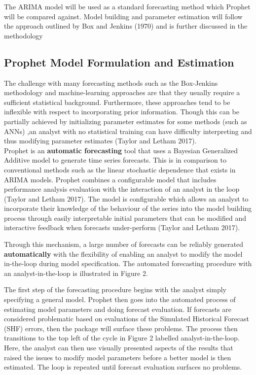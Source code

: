 \documentclass[12pt,a4paper]{article}
\numberwithin{equation}{section}
\numberwithin{figure}{section}
\numberwithin{table}{section}
\begin{document}
The ARIMA model will be used as a standard forecasting method which
Prophet will be compared against. Model building and parameter
estimation will follow the approach outlined by Box and Jenkins (1970)
and is further discussed in the methodology

\subsection{Prophet Model Formulation and
Estimation}\label{prophet-model-formulation-and-estimation}

The challenge with many forecasting methods such as the Box-Jenkins
methodology and machine-learning approaches are that they usually
require a sufficient statistical background. Furthermore, these
approaches tend to be inflexible with respect to incorporating prior
information. Though this can be partially achieved by initializing
parameter estimates for some methods (such as ANNs) ,an analyst with no
statistical training can have difficulty interpreting and thus modifying
parameter estimates (Taylor and Letham 2017).\\
Prophet is an \textbf{automatic forecasting} tool that uses a Bayesian
Generalized Additive model to generate time series forecasts. This is in
comparison to conventional methods such as the linear stochastic
dependence that exists in ARIMA models. Prophet combines a configurable
model that includes performance analysis evaluation with the interaction
of an analyst in the loop (Taylor and Letham 2017). The model is
configurable which allows an analyst to incorporate their knowledge of
the behaviour of the series into the model building process through
easily interpretable initial parameters that can be modified and
interactive feedback when forecasts under-perform (Taylor and Letham
2017).

Through this mechanism, a large number of forecasts can be reliably
generated \textbf{automatically} with the flexibility of enabling an
analyst to modify the model in-the-loop during model specification. The
automated forecasting procedure with an analyst-in-the-loop is
illustrated in Figure 2.

The first step of the forecasting procedure begins with the analyst
simply specifying a general model. Prophet then goes into the automated
process of estimating model parameters and doing forecast evaluation. If
forecasts are considered problematic based on evaluations of the
Simulated Historical Forecast (SHF) errors, then the package will
surface these problems. The process then transitions to the top left of
the cycle in Figure 2 labelled analyst-in-the-loop. Here, the analyst
can then use visually presented aspects of the results that raised the
issues to modify model parameters before a better model is then
estimated. The loop is repeated until forecast evaluation surfaces no
problems.
\end{document}
